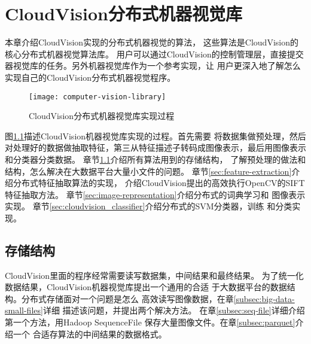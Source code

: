 \chapter{CloudVision分布式机器视觉库}
\label{cha:distributed_vision_library}
本章介绍CloudVision实现的分布式机器视觉的算法，
这些算法是CloudVision的核心分布式机器视觉算法库。
用户可以通过CloudVision的控制管理层，直接提交
器视觉库的任务。另外机器视觉库作为一个参考实现，让
用户更深入地了解怎么实现自己的CloudVision分布式机器视觉程序。

\begin{figure}[h]
  \centering
    \texttt{[image: computer-vision-library]}
  \caption{CloudVision分布式机器视觉库实现过程}
  \label{fig:computer-vision-library}
\end{figure}
图\ref{fig:computer-vision-library}描述CloudVision机器视觉库实现的过程。首先需要
将数据集做预处理，然后对处理好的数据做抽取特征，第三从特征描述子转码成图像表示，最后用图像表示
和分类器分类数据。
章节\ref{sec:storage_format}介绍所有算法用到的存储结构，
了解预处理的做法和结构，怎么解决在大数据平台大量小文件的问题。
章节\ref{sec:feature-extraction}介绍分布式特征抽取算法的实现，
介绍CloudVision提出的高效执行OpenCV的SIFT特征抽取方法。
章节\ref{sec:image-representation}介绍分布式的词典学习和
图像表示实现。
章节\ref{sec:cloudvision_classifier}介绍分布式的SVM分类器，训练
和分类实现。


\section{存储结构}
\label{sec:storage_format}
CloudVision里面的程序经常需要读写数据集，中间结果和最终结果。
为了统一化数据结果，CloudVision机器视觉库提出一个通用的合适
于大数据平台的数据结构。分布式存储面对一个问题是怎么
高效读写图像数据，在章\ref{subsec:big-data-small-files}详细
描述该问题，并提出两个解决方法。
在章\ref{subsec:seq-file}详细介绍第一个方法，用Hadoop SequenceFile
保存大量图像文件。在章\ref{subsec:parquet}介绍一个
合适存算法的中间结果的数据格式。


